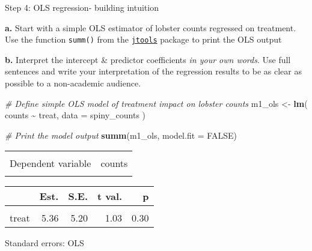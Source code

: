 \documentclass[
]{article}
\newenvironment{Shaded}{\begin{snugshade}}{\end{snugshade}}
\newcommand{\AttributeTok}[1]{\textcolor[rgb]{0.13,0.29,0.53}{#1}}
\newcommand{\CommentTok}[1]{\textcolor[rgb]{0.56,0.35,0.01}{\textit{#1}}}
\newcommand{\ConstantTok}[1]{\textcolor[rgb]{0.56,0.35,0.01}{#1}}
\newcommand{\FunctionTok}[1]{\textcolor[rgb]{0.13,0.29,0.53}{\textbf{#1}}}
\newcommand{\NormalTok}[1]{#1}
\newcommand{\OtherTok}[1]{\textcolor[rgb]{0.56,0.35,0.01}{#1}}
\newcommand{\SpecialCharTok}[1]{\textcolor[rgb]{0.81,0.36,0.00}{\textbf{#1}}}
\begin{document}
Step 4: OLS regression- building intuition

\textbf{a.} Start with a simple OLS estimator of lobster counts
regressed on treatment. Use the function \texttt{summ()} from the
\href{https://jtools.jacob-long.com/}{\texttt{jtools}} package to print
the OLS output

\textbf{b.} Interpret the intercept \& predictor coefficients \emph{in
your own words}. Use full sentences and write your interpretation of the
regression results to be as clear as possible to a non-academic
audience.

\begin{Shaded}
\begin{Highlighting}[]
\CommentTok{\# Define simple OLS model of treatment impact on lobster counts}
\NormalTok{m1\_ols }\OtherTok{\textless{}{-}} \FunctionTok{lm}\NormalTok{(}
\NormalTok{    counts }\SpecialCharTok{\textasciitilde{}}\NormalTok{ treat,}
    \AttributeTok{data =}\NormalTok{ spiny\_counts}
\NormalTok{)}

\CommentTok{\# Print the model output}
\FunctionTok{summ}\NormalTok{(m1\_ols, }\AttributeTok{model.fit =} \ConstantTok{FALSE}\NormalTok{) }
\end{Highlighting}
\end{Shaded}

\begin{table}[!h]
\centering
\begin{tabular}{lr}
\toprule
\cellcolor{gray!10}{Observations} & \cellcolor{gray!10}{252}\\
Dependent variable & counts\\
\cellcolor{gray!10}{Type} & \cellcolor{gray!10}{OLS linear regression}\\
\bottomrule
\end{tabular}
\end{table}  \begin{table}[!h]
\centering
\begin{threeparttable}
\begin{tabular}{lrrrr}
\toprule
  & Est. & S.E. & t val. & p\\
\midrule
\cellcolor{gray!10}{(Intercept)} & \cellcolor{gray!10}{22.73} & \cellcolor{gray!10}{3.57} & \cellcolor{gray!10}{6.36} & \cellcolor{gray!10}{0.00}\\
treat & 5.36 & 5.20 & 1.03 & 0.30\\
\bottomrule
\end{tabular}
\begin{tablenotes}
\item Standard errors: OLS
\end{tablenotes}
\end{threeparttable}
\end{table}
\end{document}
